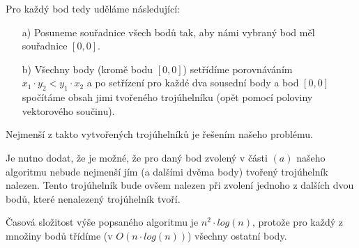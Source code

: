 \documentclass[a4paper, 12pt]{article}
\begin{document}
  Pro každý bod tedy uděláme následující:
  \begin{itemize}
    \item[a)] Posuneme souřadnice všech bodů tak, aby námi vybraný bod měl souřadnice $[0,0]$.
    \item[b)] Všechny body (kromě bodu $[0,0]$) setřídíme porovnáváním $x_1 \cdot y_2 < y_1 \cdot x_2$ a po setřízení pro každé dva sousední body a bod $[0,0]$ spočítáme obsah jimi tvořeného trojúhelníku (opět pomocí poloviny vektorového součinu).
  \end{itemize}

  Nejmenší z takto vytvořených trojúhelníků je řešením našeho problému.

  Je nutno dodat, že je možné, že pro daný bod zvolený v části $(a)$ našeho algoritmu nebude nejmenší jím (a dalšími dvěma body) tvořený trojúhelník nalezen. Tento trojúhelník bude ovšem nalezen při zvolení jednoho z dalších dvou bodů, které nenalezený trojúhelník tvoří.

  Časová složitost výše popsaného algoritmu je $n^2 \cdot log(n)$, protože pro každý z množiny bodů třídíme (v $O(n \cdot log(n))$) všechny ostatní body.
\end{document}
